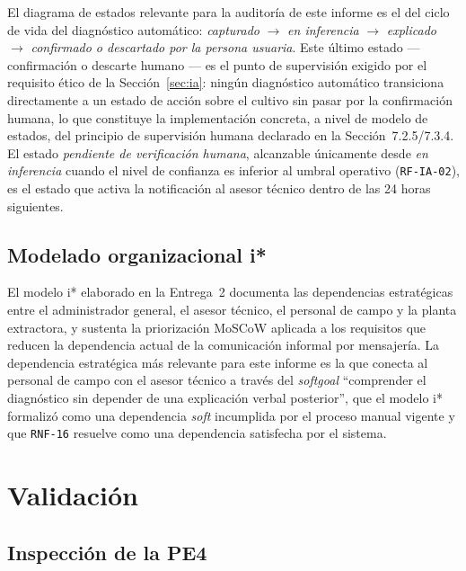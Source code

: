 \documentclass[11pt,a4paper]{article}
\newcommand{\id}[1]{\texttt{#1}}
\begin{document}
El diagrama de estados relevante para la auditoría de este informe es el del ciclo de vida del
diagnóstico automático: \emph{capturado} $\to$ \emph{en inferencia} $\to$ \emph{explicado} $\to$
\emph{confirmado o descartado por la persona usuaria}. Este último estado --- confirmación o
descarte humano --- es el punto de supervisión exigido por el requisito ético de la
Sección~\ref{sec:ia}: ningún diagnóstico automático transiciona directamente a un estado de acción
sobre el cultivo sin pasar por la confirmación humana, lo que constituye la implementación concreta,
a nivel de modelo de estados, del principio de supervisión humana declarado en la
Sección~7.2.5/7.3.4. El estado \emph{pendiente de verificación humana}, alcanzable únicamente desde
\emph{en inferencia} cuando el nivel de confianza es inferior al umbral operativo (\id{RF-IA-02}),
es el estado que activa la notificación al asesor técnico dentro de las 24 horas siguientes.

\subsection{Modelado organizacional i*}

El modelo i* elaborado en la Entrega~2 documenta las dependencias estratégicas entre el
administrador general, el asesor técnico, el personal de campo y la planta extractora, y sustenta
la priorización MoSCoW aplicada a los requisitos que reducen la dependencia actual de la
comunicación informal por mensajería. La dependencia estratégica más relevante para este informe es
la que conecta al personal de campo con el asesor técnico a través del \emph{softgoal}
``comprender el diagnóstico sin depender de una explicación verbal posterior'', que el modelo i*
formalizó como una dependencia \emph{soft} incumplida por el proceso manual vigente y que \id{RNF-16}
resuelve como una dependencia satisfecha por el sistema.

\section{Validación}
\label{sec:validacion}

\subsection{Inspección de la PE4}
\end{document}
